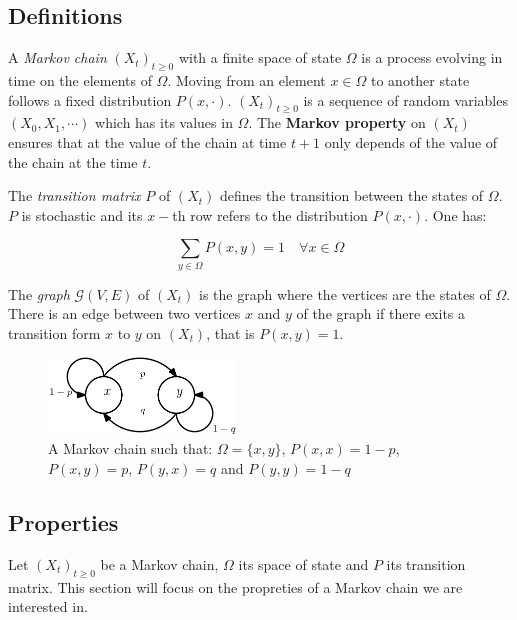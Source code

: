 \documentclass[11pt]{article}
\begin{document}
\subsection{Definitions}

A \textit{Markov chain} $(X_t)_{t\geq{0}}$ with a finite space of state $\Omega$ is a process evolving in time on the elements of $\Omega$. Moving from an element $x \in \Omega$ to another state follows a fixed distribution $P(x,\cdot)$. $(X_t)_{t\geq{0}}$ is a sequence of random variables $(X_0, X_1, \cdots)$ which has its values in $\Omega$. The \textbf{Markov property} on $(X_t)$ ensures that at the value of the chain at time $t+1$  only depends of the value of the chain at the time $t$.

The \textit{transition matrix} $P$ of $(X_t)$ defines the transition between the states of $\Omega$. $P$ is stochastic and its $x-$th row refers to the distribution $P(x,\cdot)$. One has:

\begin{equation}
  \sum_{y \in \Omega} P(x,y) = 1 \quad \forall{x \in \Omega}
\end{equation}

The \textit{graph} $\mathcal{G}(V,E)$ of $(X_t)$ is the graph where the vertices are the states of $\Omega$. There is an edge between two vertices $x$ and $y$ of the graph if there exits a transition form $x$ to $y$ on $(X_t)$, that is $P(x,y)=1$.

\begin{figure}
  \begin{center}
    \includegraphics[width=5cm]{assets/frog}
    \caption{A Markov chain such that: $\Omega = \{x,y\}$, $P(x,x) = 1-p$, $P(x,y) = p$,  $P(y,x) = q$ and $P(y,y) = 1-q$}
    \label{fig:fig1}
  \end{center}
\end{figure}



\subsection{Properties}

Let $(X_t)_{t\geq{0}}$ be a Markov chain, $\Omega$ its space of state and $P$ its transition matrix. This section will focus on the propreties of a Markov chain we are interested in.
\end{document}
